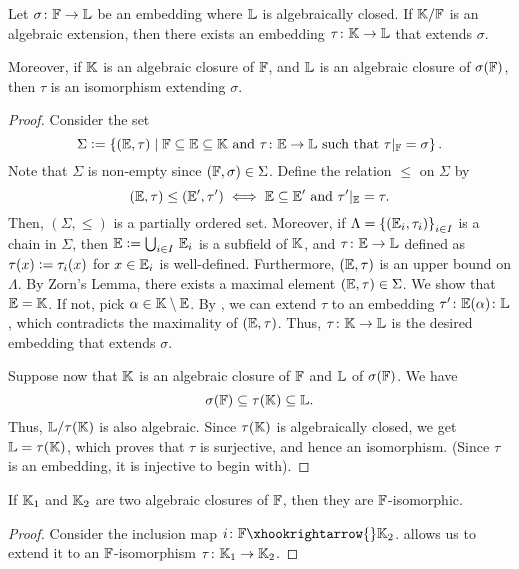 \begin{theorem} \label{thm:isomorphic-embedding-extension}
    Let $\sigma \colon \mathbb{F} \to \mathbb{L}$ be an embedding where $\mathbb{L}$ is algebraically closed. If $\mathbb{K}/\mathbb{F}$ is an algebraic extension, then there exists an embedding $\tau \colon \mathbb{K} \to \mathbb{L}$ that extends $\sigma$. 
    
    Moreover, if $\mathbb{K}$ is an algebraic closure of $\mathbb{F}$, and $\mathbb{L}$ is an algebraic closure of $\sigma(\mathbb{F})$, then $\tau$ is an isomorphism extending $\sigma$. 
\end{theorem}
\begin{proof}
    Consider the set
    \[
        \Sigma \vcentcolon= \left\{ (\mathbb{E}, \tau) \mid \mathbb{F} \subseteq \mathbb{E} \subseteq \mathbb{K} \text{ and } \tau \colon \mathbb{E} \to \mathbb{L} \text{ such that } \tau|_{\mathbb{F}} = \sigma \right\}.
    \]
    Note that $\Sigma$ is non-empty since $(\mathbb{F},\sigma) \in\Sigma$. Define the relation $\leq$ on $\Sigma$ by
    \[
        (\mathbb{E}, \tau) \leq (\mathbb{E}^{\prime}, \tau^{\prime}) \iff \mathbb{E} \subseteq \mathbb{E}^{\prime} \text{ and } \tau^{\prime}|_{\mathbb{E}} = \tau.
    \]
    Then, $(\Sigma, \leq)$ is a partially ordered set. Moreover, if $\Lambda = \left\{ (\mathbb{E}_i, \tau_i) \right\}_{i \in I}$ is a chain in $\Sigma$, then $\mathbb{E} \vcentcolon= \bigcup_{i \in I} \, \mathbb{E}_i$ is a subfield of $\mathbb{K}$, and $\tau \colon \mathbb{E} \to \mathbb{L}$ defined as $\tau(x) \vcentcolon= \tau_i(x)$ for $x \in \mathbb{E}_i$ is well-defined. Furthermore, $(\mathbb{E}, \tau)$ is an upper bound on $\Lambda$. By Zorn's Lemma, there exists a maximal element $(\mathbb{E}, \tau) \in \Sigma$. We show that $\mathbb{E} = \mathbb{K}$. If not, pick $\alpha \in \mathbb{K} \setminus \mathbb{E}$. By , we can extend $\tau$ to an embedding $\tau^{\prime} \colon \mathbb{E}(\alpha) \colon \mathbb{L}$, which contradicts the maximality of $(\mathbb{E},\tau)$. Thus, $\tau \colon \mathbb{K} \to \mathbb{L}$ is the desired embedding that extends $\sigma$.
    
    Suppose now that $\mathbb{K}$ is an algebraic closure of $\mathbb{F}$ and $\mathbb{L}$ of $\sigma(\mathbb{F})$. We have
    \[
        \sigma(\mathbb{F}) \subseteq \tau(\mathbb{K}) \subseteq \mathbb{L}.
    \]
    Thus, $\mathbb{L} / \tau(\mathbb{K})$ is also algebraic. Since $\tau(\mathbb{K})$ is algebraically closed, we get $\mathbb{L} = \tau(\mathbb{K})$, which proves that $\tau$ is surjective, and hence an isomorphism. (Since $\tau$ is an embedding, it is injective to begin with).
\end{proof}

\begin{cor} \label{cor:iso-AC}
    If $\mathbb{K}_1$ and $\mathbb{K}_2$ are two algebraic closures of $\mathbb{F}$, then they are $\mathbb{F}$-isomorphic.
\end{cor}
\begin{proof}
    Consider the inclusion map $i \colon \F \xhookrightarrow{} \K_2$.  allows us to extend it to an $\mathbb{F}$-isomorphism $\tau \colon \mathbb{K}_1 \to \mathbb{K}_2$.
\end{proof}

